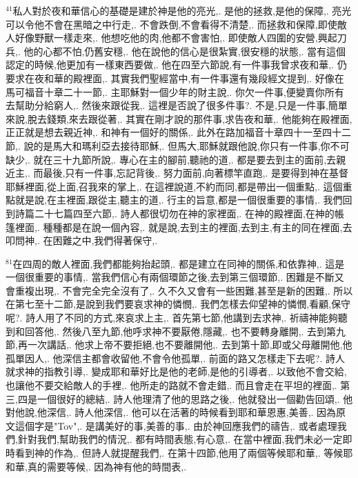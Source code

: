 \documentclass{book}
\begin{document}
$^{41}$私人對於夜和華信心的基礎是建於神是他的亮光,.
是他的拯救,是他的保障,.
亮光可以令他不會在黑暗之中行走,.
不會跌倒,不會看得不清楚,.
而拯救和保障,即使敵人好像野獸一樣走來,.
他想吃他的肉,他都不會害怕,.
即使敵人四圍的安營,興起刀兵,.
他的心都不怕,仍舊安穩,.
他在說他的信心是很紮實,很安穩的狀態,.
當有這個認定的時候,他更加有一樣東西要做,.
他在四至六節說,有一件事我曾求夜和華,.
仍要求在夜和華的殿裡面,.
其實我們聖經當中,有一件事還有幾段經文提到,.
好像在馬可福音十章二十一節,.
主耶穌對一個少年的財主說,.
你欠一件事,便變賣你所有去幫助分給窮人,.
然後來跟從我,.
這裡是否說了很多件事?.
不是,只是一件事,簡單來說,脫去錢類,來去跟從著,.
其實在剛才說的那件事,求告夜和華,.
他能夠在殿裡面,正正就是想去親近神,.
和神有一個好的關係,.
此外在路加福音十章四十一至四十二節,.
說的是馬大和瑪利亞去接待耶穌,.
但馬大,耶穌就跟他說,你只有一件事,你不可缺少,.
就在三十九節所說,.
專心在主的腳前,聽祂的道,.
都是要去到主的面前,去親近主,.
而最後,只有一件事,忘記背後,.
努力面前,向著標竿直跑,.
是要得到神在基督耶穌裡面,從上面,召我來的掌上,.
在這裡說道,不約而同,都是帶出一個重點,.
這個重點就是說,在主裡面,跟從主,聽主的道,.
行主的旨意,都是一個很重要的事情,.
我們回到詩篇二十七篇四至六節,.
詩人都很切勿在神的家裡面,.
在神的殿裡面,在神的帳篷裡面,.
種種都是在說一個內容,.
就是說,去到主的裡面,去到主,有主的同在裡面,去叩問神,.
在困難之中,我們得著保守,.

$^{81}$在四周的敵人裡面,我們都能夠抬起頭,.
都是建立在同神的關係,和依靠神,.
這是一個很重要的事情,.
當我們信心有兩個環節之後,去到第三個環節,.
困難是不斷又會重複出現,.
不會完全完全沒有了,.
久不久又會有一些困難,甚至是新的困難,.
所以在第七至十二節,是說到我們要哀求神的憐憫,.
我們怎樣去仰望神的憐憫,看顧,保守呢?.
詩人用了不同的方式,來哀求上主,.
首先第七節,他講到去求神,.
祈禱神能夠聽到和回答他,.
然後八至九節,他呼求神不要厭倦,隱藏,.
也不要轉身離開,.
去到第九節,再一次講話,.
他求上帝不要拒絕,也不要離開他,.
去到第十節,即或父母離開他,他孤單因人,.
他深信主都會收留他,不會令他孤單,.
前面的路又怎樣走下去呢?.
詩人就求神的指教引導,.
變成耶和華好比是他的老師,是他的引導者,.
以致他不會交給,也讓他不要交給敵人的手裡,.
他所走的路就不會走錯,.
而且會走在平坦的裡面,.
第三,四是一個很好的總結,.
詩人他理清了他的思路之後,.
他就發出一個勸告回頌,.
他對他說,他深信,.
詩人他深信,.
他可以在活著的時候看到耶和華恩惠,美善,.
因為原文這個字是"Tov",.
是講美好的事,美善的事,.
由於神回應我們的禱告,.
或者處理我們,針對我們,幫助我們的情況,.
都有時間表態,有心意,.
在當中裡面,我們未必一定即時看到神的作為,.
但詩人就提醒我們,.
在第十四節,他用了兩個等候耶和華,.
等候耶和華,真的需要等候,.
因為神有他的時間表,.
\end{document}
